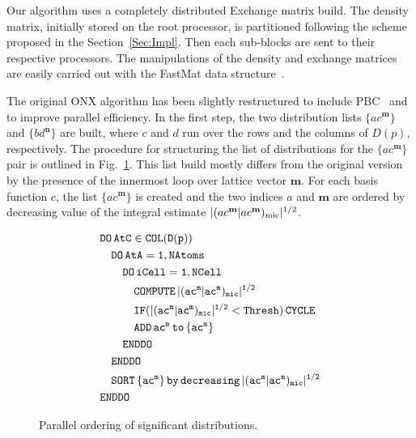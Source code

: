 \documentclass[twocolumn,showkeys,showpacs,preprintnumbers,amsmath,amssymb]{revtex4}
\begin{document}
Our algorithm uses a completely distributed Exchange matrix
build. The density matrix, initially stored on the root
processor, is partitioned following the scheme
proposed in the Section~\ref{Sec:Impl}. Then each sub-blocks are sent
to their respective processors. The manipulations of the density 
and exchange matrices are easily
carried out with the FastMat data structure~\cite{CGan04B}.

The original ONX algorithm has been slightly restructured 
to include PBC~\cite{CTymczak04b} and to improve parallel efficiency.
In the first step, the two distribution lists $\{ac^\mathbf{m}\}$ and
$\{bd^\mathbf{n}\}$ are built, where $c$ and $d$ run over the rows and the
columns of $D(p)$, respectively. The procedure for structuring the list of distributions
for the $\{ac^\mathbf{m}\}$ pair is outlined in Fig.~\ref{Fig:List}.
This list build mostly differs from the original version by the presence
of the innermost loop over lattice vector $\mathbf{m}$. For
each basis function $c$, the list $\{ac^\mathbf{m}\}$ is created and the 
two indices $a$ and $\mathbf{m}$ are ordered by decreasing value 
of the integral estimate $|(ac^\mathbf{m}|ac^\mathbf{m})_{\rm mic}|^{1/2}$.

\begin{figure}[htbp]
  \centering
  \caption{\protect
    Parallel ordering of significant distributions.
  }\label{Fig:List}
  \begin{equation*}
    \begin{split}
      &\tt          DO\,AtC\in COL(D(p))\\
      &\tt\quad       DO\,AtA=1,NAtoms\\
      &\tt\qquad        DO\,iCell=1,NCell\\
      &\tt\qquad\quad     COMPUTE\,|(ac^m|ac^m)_{mic}|^{1/2}\\
      &\tt\qquad\quad     IF(|(ac^m|ac^m)_{mic}|^{1/2}<{\tt Thresh)\,CYCLE}\\
      &\tt\qquad\quad     ADD\,ac^m\,{\tt to}\, \{ac^m\}\\
      &\tt\qquad        ENDDO\\
      &\tt\quad       ENDDO\\
      &\tt\quad       SORT\,\{ac^m\}\,by\,decreasing\,|(ac^m|ac^m)_{mic}|^{1/2}\\
      &\tt         ENDDO
    \end{split}
  \end{equation*}
\end{figure}
\end{document}

